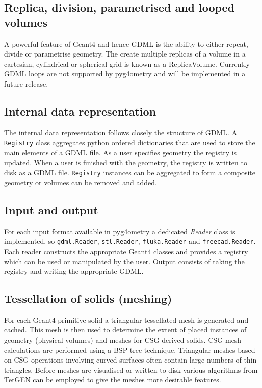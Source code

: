 \documentclass[final,5p,times,twocolumn]{elsarticle}
\begin{document}
\subsection{Replica, division, parametrised and looped volumes}
A powerful feature of Geant4 and hence GDML is the ability to either repeat, divide or parametrise geometry. The create multiple replicas of a volume in a cartesian, cylindrical or 
spherical grid is known as a ReplicaVolume. Currently GDML loops are not supported by pyg4ometry and will be implemented in a future release. 

\subsection{Internal data representation} 
The internal data representation follows closely the structure of GDML. A \verb|Registry| class aggregates python ordered dictionaries that are  used to store the main 
elements of a GDML file. As a user specifies geometry the registry is updated. When a user is finished with the geometry, the registry is written to disk as a GDML file.
\verb|Registry| instances can be aggregated to form a composite geometry or volumes can be removed and added.   
  
\subsection{Input and output} 
For each input format available in pyg4ometry a dedicated {\it Reader} class is implemented, so \verb|gdml.Reader|, \verb|stl.Reader|, \verb|fluka.Reader| 
and \verb|freecad.Reader|. Each reader constructs the appropriate Geant4 classes and provides a registry which can be used or manipulated by the user. 
Output consists of taking the registry and writing the appropriate GDML.

\subsection{Tessellation of solids (meshing)}
For each Geant4 primitive solid a triangular tessellated mesh is generated and cached. This mesh is then used to determine the extent of placed instances of 
geometry (physical volumes) and meshes for CSG derived solids. CSG mesh calculations are performed using a BSP tree technique. Triangular meshes based
on CSG operations involving curved surfaces often contain large numbers of thin triangles. Before meshes are visualised or written to disk various algorithms from 
TetGEN can be employed to give the meshes more desirable features. 
\end{document}
